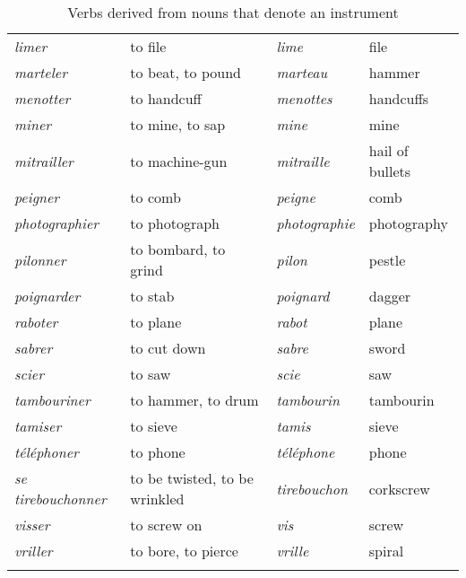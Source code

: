 \documentclass[output=paper]{langsci/langscibook}
\begin{document}
\begin{table}
{\begin{tabular}[c]{@{}llll@{}}
\emph{limer} & to file & \emph{lime} & file\\
\emph{marteler} & to beat, to pound & \emph{marteau} &
hammer\\
\emph{menotter} & to handcuff & \emph{menottes} &
handcuffs\\
\emph{miner} & to mine, to sap & \emph{mine} & mine\\
\emph{mitrailler} & to machine-gun & \emph{mitraille} & hail of bullets\\
\emph{peigner} & to comb & \emph{peigne} & comb\\
\emph{photographier} & to photograph & \emph{photographie} &
photography\\
\emph{pilonner} & to bombard, to grind & \emph{pilon} &
pestle\\
\emph{poignarder} & to stab & \emph{poignard} & dagger\\
\emph{raboter} & to plane & \emph{rabot} & plane\\
\emph{sabrer} & to cut down & \emph{sabre} & sword\\
\emph{scier} & to saw & \emph{scie} & saw\\
\emph{tambouriner} & to hammer, to drum & \emph{tambourin} &
tambourin\\
\emph{tamiser} & to sieve & \emph{tamis} & sieve\\
\emph{téléphoner} & to phone & \emph{téléphone} & phone\\
\emph{se tirebouchonner} & to be twisted, to be wrinkled &
\emph{tirebouchon} & corkscrew\\
\emph{visser} & to screw on & \emph{vis} & screw\\
\emph{vriller} & to bore, to pierce & \emph{vrille} &
spiral\\
\lspbottomrule
\end{tabular}}
\caption{Verbs derived from nouns that denote an instrument}
\label{tab:Schwarze:8}
\end{table}
\end{document}
